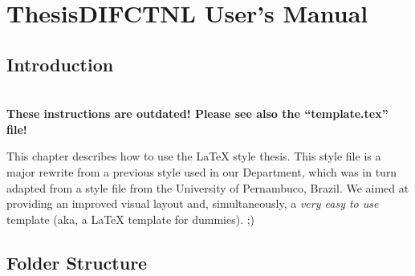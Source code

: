 \chapter{ThesisDIFCTNL User's Manual}
\label{cha:users_manual}

\section{Introduction} %
\label{sec:introduction}

{\LARGE \textbf{~\\These instructions are outdated! Please see also the “template.tex” file!\\}}

This chapter describes how to use the \LaTeX{} style thesis{}. This style file is a major rewrite from a previous style used in our Department, which was in turn adapted from a style file from the University of Pernambuco, Brazil.  We aimed at providing an improved visual layout and, simultaneously, a \emph{very easy to use} template (aka, a \LaTeX{} template for dummies). ;)

\noindent%

\section{Folder Structure} %
\label{sec:folder_structure}

